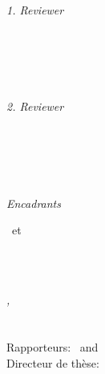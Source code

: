 \begin{titlepage}
	\vfill
	\begin{minipage}[t]{.27\textwidth}
		\raggedleft
		\textit{1. Reviewer}
	\end{minipage}
	\hspace*{15pt}
	\begin{minipage}[t]{.65\textwidth}
		{\Large \thesisFirstReviewer} \\
	  	{\small \thesisFirstReviewerDepartment} \\[-1mm]
		{\small \thesisFirstReviewerUniversity}
	\end{minipage} \\[5mm]
	\begin{minipage}[t]{.27\textwidth}
		\raggedleft
		\textit{2. Reviewer}
	\end{minipage}
	\hspace*{15pt}
	\begin{minipage}[t]{.65\textwidth}
		{\Large \thesisSecondReviewer} \\
	  	{\small \thesisSecondReviewerDepartment} \\[-1mm]
		{\small \thesisSecondReviewerUniversity}
	\end{minipage} \\[10mm]
	\begin{minipage}[t]{.27\textwidth}
		\raggedleft
		\textit{Encadrants}
	\end{minipage}
	\hspace*{15pt}
	\begin{minipage}[t]{.65\textwidth}
		\thesisFirstSupervisor\ et \thesisSecondSupervisor
	\end{minipage} \\[10mm]

	\thesisDate \\
    \vfill
    


\end{titlepage}


\hfill
\vfill
{
	\small
	\textit{\thesisTitle,} \thesisName \\
    \textcopyright\ \thesisDate \\
	\thesisSubject\\
	Rapporteurs: \thesisFirstReviewer\ and \thesisSecondReviewer \\
	Directeur de th\`ese: \thesisFirstSupervisor\\
	\textbf{\thesisUniversity} \\
	\thesisUniversityDepartment \\
    \textit{\thesisUniversityGroup} \\
	\thesisUniversityInstitute \\
	\thesisUniversityStreetAddress \\
	\thesisUniversityPostalCode\ \thesisUniversityCity
}
